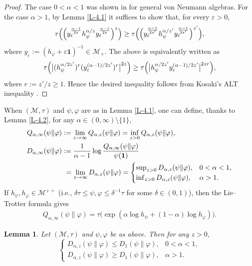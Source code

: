 \documentclass[12pt]{article}
\newtheorem{lemma}[theorem]{Lemma}
\theoremstyle{definition}
\theoremstyle{remark}
\numberwithin{equation}{section}
\def\Me{\mathcal M}
\def\ffi{\varphi}
\def\1{\mathbf{1}}
\def\eps{\varepsilon}
\begin{document}
\begin{proof}
The case $0<\alpha<1$ was shown in \cite[Theorem 1(x)]{kato2023onrenyi} for general von Neumann algebras.
For the case $\alpha>1$, by Lemma \ref{L-4.1} it suffices to show that, for every $\eps>0$,
\[
\tau\Bigl(\Bigl(y_\eps^{\alpha-1\over2z}h_\psi^{\alpha/z}y_\eps^{\alpha-1\over2z}\Bigr)^z\Bigr)
\ge\tau\Bigl(\Bigl(y_\eps^{\alpha-1\over2z'}h_\psi^{\alpha/z'}y_\eps^{\alpha-1\over2z'}\Bigr)^{z'}\Bigr),
\]
where $y_\eps:=(h_\ffi+\eps\1)^{-1}\in\Me_+$. The above is equivalently written as
\[
\tau\Bigl(\big|(h_\psi^{\alpha/2z'})^r(y_\eps^{(\alpha-1)/2z'})^r\big|^{2z}\Bigr)
\ge\tau\Bigl(\big|h_\psi^{\alpha/2z'} y_\eps^{(\alpha-1)/2z'}\big|^{2zr}\Bigr),
\]
where $r:=z'/z\ge1$. Hence the desired inequality follows from Kosaki's ALT inequality
\cite[Corollary 3]{kosaki1992aninequality}.
\end{proof}

When $(\Me,\tau)$ and $\psi,\ffi$ are as in Lemma \ref{L-4.1}, one can define, thanks to Lemma \ref{L-4.2},
for any $\alpha\in(0,\infty)\setminus\{1\}$,
\begin{align}
Q_{\alpha,\infty}(\psi\|\ffi)&:=\lim_{z\to\infty}Q_{\alpha,z}(\psi\|\ffi)
=\inf_{z>0}Q_{\alpha,z}(\psi\|\ffi), \nonumber\\
D_{\alpha,\infty}(\psi\|\ffi)&:={1\over\alpha-1}\log{Q_{\alpha,\infty}(\psi\|\ffi)\over\psi(\1)} \nonumber\\
&\ =\lim_{z\to\infty}D_{\alpha,z}(\psi\|\ffi)
=\begin{cases}\sup_{z>0}D_{\alpha,z}(\psi\|\ffi), & \text{$0<\alpha<1$},\\
\inf_{z>0}D_{\alpha,z}(\psi\|\ffi), & \text{$\alpha>1$}.\end{cases} \label{F-4.11}
\end{align}
If $h_\psi,h_\ffi\in\Me^{++}$ (i.e., $\delta\tau\le\psi,\ffi\le\delta^{-1}\tau$ for some $\delta\in(0,1)$), then
the Lie--Trotter formula gives
\begin{align}\label{F-4.12}
Q_{\alpha,\infty}(\psi\|\ffi)=\tau\bigl(\exp(\alpha\log h_\psi+(1-\alpha)\log h_\ffi)\bigr).
\end{align}

\begin{lemma}\label{L-4.3}
Let $(\Me,\tau)$ and $\psi,\ffi$ be as above. Then for any $z>0$,
\[
\begin{cases}
D_{\alpha,z}(\psi\|\ffi)\le D_1(\psi\|\ffi), & \text{$0<\alpha<1$},\\
D_{\alpha,z}(\psi\|\ffi)\ge D_1(\psi\|\ffi), & \text{$\alpha>1$}.
\end{cases}
\]
\end{lemma}
\end{document}
